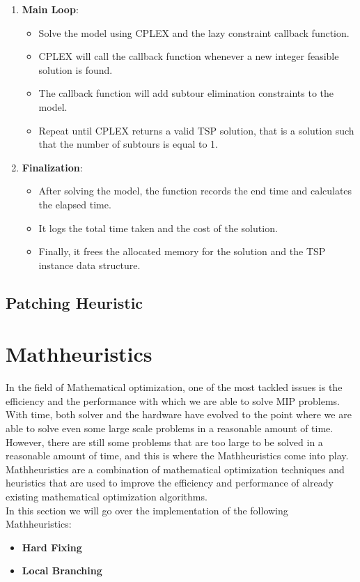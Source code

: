 \documentclass{article}
\begin{document}
\begin{enumerate}
\begin{lstlisting}[language=C]
	\end{lstlisting}
	\item \textbf{Main Loop}:
	\begin{itemize}
		\item Solve the model using CPLEX and the lazy constraint callback function.
		\item CPLEX will call the callback function whenever a new integer feasible solution is found.
		\item The callback function will add subtour elimination constraints to the model.
		\item Repeat until CPLEX returns a valid TSP solution, that is a solution such that the number of subtours is equal to 1.
	\end{itemize}
	\item \textbf{Finalization}:
	\begin{itemize}
		\item After solving the model, the function records the end time and calculates the elapsed time.
		\item It logs the total time taken and the cost of the solution.
		\item Finally, it frees the allocated memory for the solution and the TSP instance data structure.
	\end{itemize}
\end{enumerate}

\subsection{Patching Heuristic}


\section{Mathheuristics}
In the field of Mathematical optimization, one of the most tackled issues is the efficiency and the performance with which
we are able to solve MIP problems. With time, both solver and the hardware have evolved to the point where we are able to solve even some large scale problems 
in a reasonable amount of time. However, there are still some problems that are too large to be solved in a reasonable amount of time, and this is where the Mathheuristics 
come into play. Mathheuristics are a combination of mathematical optimization techniques and heuristics that are used to improve the efficiency and performance of 
already existing mathematical optimization algorithms.\cite{Fischetti2003LocalBranching}\cite{Fischetti2016Matheuristics} \\
In this section we will go over the implementation of the following Mathheuristics:
\begin{itemize}
	\item \textbf{Hard Fixing}
	\item \textbf{Local Branching}
\end{itemize}
\end{document}
